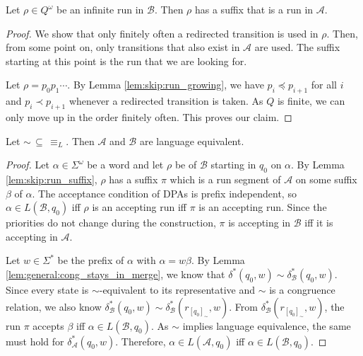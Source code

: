 \begin{lem}
\label{lem:skip:run_suffix}
	Let $\rho \in Q^\omega$ be an infinite run in $\mathcal{B}$. Then $\rho$ has a suffix that is a run in $\mathcal{A}$.
\end{lem} 

\begin{proof}
	We show that only finitely often a redirected transition is used in $\rho$. Then, from some point on, only transitions that also exist in $\mathcal{A}$ are used. The suffix starting at this point is the run that we are looking for.
	
	Let $\rho = p_0 p_1 \cdots$. By Lemma \ref{lem:skip:run_growing}, we have $p_i \preceq p_{i+1}$ for all $i$ and $p_i \prec p_{i+1}$ whenever a redirected transition is taken. As $Q$ is finite, we can only move up in the order finitely often. This proves our claim.
\end{proof}


\begin{theorem}
	Let $\sim \,\subseteq\, \equiv_L$. Then $\mathcal{A}$ and $\mathcal{B}$ are language equivalent.
\label{thm:skip:lang_equiv}
\end{theorem}

\begin{proof}
	Let $\alpha \in \Sigma^\omega$ be a word and let $\rho$ be of $\mathcal{B}$ starting in $q_0$ on $\alpha$. By Lemma \ref{lem:skip:run_suffix}, $\rho$ has a suffix $\pi$ which is a run segment of $\mathcal{A}$ on some suffix $\beta$ of $\alpha$. The acceptance condition of DPAs is prefix independent, so $\alpha \in L(\mathcal{B}, q_0)$ iff $\rho$ is an accepting run iff $\pi$ is an accepting run. Since the priorities do not change during the construction, $\pi$ is accepting in $\mathcal{B}$ iff it is accepting in $\mathcal{A}$.
	
	Let $w \in \Sigma^*$ be the prefix of $\alpha$ with $\alpha = w \beta$. By Lemma \ref{lem:general:cong_stays_in_merge}, we know that $\delta^*(q_0, w) \sim \delta^*_\mathcal{B}(q_0, w)$. Since every state is $\sim$-equivalent to its representative and $\sim$ is a congruence relation, we also know $\delta^*_\mathcal{B}(q_0, w) \sim \delta^*_\mathcal{B}(r_{[q_0]_\sim}, w)$. From $\delta^*_\mathcal{B}(r_{[q_0]_\sim}, w)$, the run $\pi$ accepts $\beta$ iff $\alpha \in L(\mathcal{B}, q_0)$. As $\sim$ implies language equivalence, the same must hold for $\delta^*_\mathcal{A}(q_0, w)$. Therefore, $\alpha \in L(\mathcal{A}, q_0)$ iff $\alpha \in L(\mathcal{B}, q_0)$.
\end{proof}




